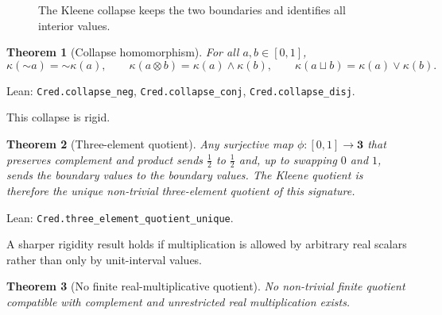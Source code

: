 \documentclass[11pt,a4paper]{article}
\newtheorem{theorem}{Theorem}[section]
\newcommand{\collapse}{\kappa}
\newcommand{\negc}{\mathord{\sim}}
\newcommand{\conjc}{\otimes}
\newcommand{\disjc}{\sqcup}
\newcommand{\half}{\tfrac12}
\newcommand{\three}{\mathbf{3}}
\newcommand{\Lean}[1]{\texttt{#1}}
\begin{document}
\begin{figure}[h]
\centering
{}
\caption{The Kleene collapse keeps the two boundaries and identifies
all interior values.}
\label{fig:collapse}
\end{figure}

\begin{theorem}[Collapse homomorphism]
\label{thm:collapse}
For all $a,b\in[0,1]$,
\[
  \collapse(\negc a)=\negc\collapse(a),\qquad
  \collapse(a\conjc b)=\collapse(a)\wedge\collapse(b),\qquad
  \collapse(a\disjc b)=\collapse(a)\vee\collapse(b).
\]
\end{theorem}

\noindent
Lean: \Lean{Cred.collapse\_neg},
\Lean{Cred.collapse\_conj},
\Lean{Cred.collapse\_disj}.

This collapse is rigid.

\begin{theorem}[Three-element quotient]
\label{thm:three-quotient}
Any surjective map $\phi:[0,1]\to\three$ that preserves complement
and product sends $\half$ to $\half$ and, up to swapping $0$ and $1$,
sends the boundary values to the boundary values.  The Kleene quotient
is therefore the unique non-trivial three-element quotient of this
signature.
\end{theorem}

\noindent
Lean: \Lean{Cred.three\_element\_quotient\_unique}.

A sharper rigidity result holds if multiplication is allowed by
arbitrary real scalars rather than only by unit-interval values.

\begin{theorem}[No finite real-multiplicative quotient]
\label{thm:real-quotient}
No non-trivial finite quotient compatible with complement and
unrestricted real multiplication exists.
\end{theorem}
\end{document}

